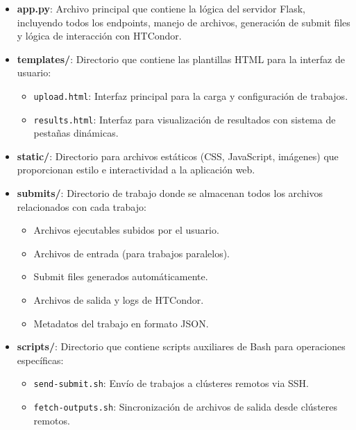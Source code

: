 \begin{itemize}
	\item \textbf{app.py}: Archivo principal que contiene la lógica del servidor Flask, incluyendo todos los endpoints, manejo de archivos, generación de submit files y lógica de interacción con HTCondor.
	
	\item \textbf{templates/}: Directorio que contiene las plantillas HTML para la interfaz de usuario:
	\begin{itemize}
		\item \texttt{upload.html}: Interfaz principal para la carga y configuración de trabajos.
		\item \texttt{results.html}: Interfaz para visualización de resultados con sistema de pestañas dinámicas.
	\end{itemize}
	
	\item \textbf{static/}: Directorio para archivos estáticos (CSS, JavaScript, imágenes) que proporcionan estilo e interactividad a la aplicación web.
	
	\item \textbf{submits/}: Directorio de trabajo donde se almacenan todos los archivos relacionados con cada trabajo:
	\begin{itemize}
		\item Archivos ejecutables subidos por el usuario.
		\item Archivos de entrada (para trabajos paralelos).
		\item Submit files generados automáticamente.
		\item Archivos de salida y logs de HTCondor.
		\item Metadatos del trabajo en formato JSON.
	\end{itemize}
	
	\item \textbf{scripts/}: Directorio que contiene scripts auxiliares de Bash para operaciones específicas:
	\begin{itemize}
		\item \texttt{send-submit.sh}: Envío de trabajos a clústeres remotos via SSH.
		\item \texttt{fetch-outputs.sh}: Sincronización de archivos de salida desde clústeres remotos.
	\end{itemize}
\end{itemize}

